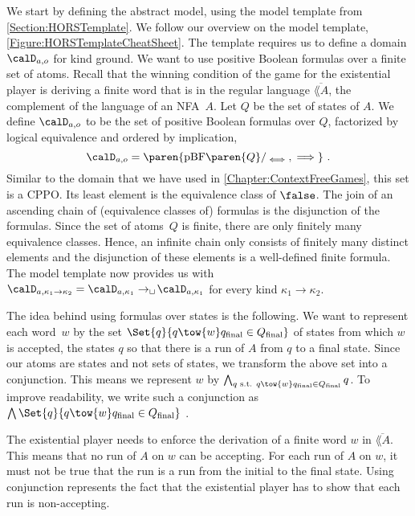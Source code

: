 \documentclass[../../diss.tex]{subfiles}
\begin{document}
We start by defining the abstract model, using the model template from \cref{Section:HORSTemplate}.
We follow our overview on the model template, \cref{Figure:HORSTemplateCheatSheet}.
The template requires us to define a domain $\domaina{\ground}$ for kind ground.
We want to use positive Boolean formulas over a finite set of atoms.
Recall that the winning condition of the game for the existential player is deriving a finite word that is in the regular language $\overline{\lang{A}}$, the complement of the language of an NFA~$A$.
Let $Q$ be the set of states of $A$.
We define $\domaina{\ground}$ to be the set of positive Boolean formulas over $Q$, factorized by logical equivalence and ordered by implication,
\[
    \domaina{\ground} =
    \paren{ \pBF\paren{Q}/_{\lequiv},\lleq }
    \ .
\]
Similar to the domain that we have used in \cref{Chapter:ContextFreeGames}, this set is a CPPO.\@
Its least element is the equivalence class of $\false$.
The join of an ascending chain of (equivalence classes of) formulas is the disjunction of the formulas.
Since the set of atoms~$Q$ is finite, there are only finitely many equivalence classes.
Hence, an infinite chain only consists of finitely many distinct elements and the disjunction of these elements is a well-defined finite formula.
The model template now provides us with $\domaina{\kappa_1 \to \kappa_2} = \domaina{\kappa_1} \cto \domaina{\kappa_1}$ for every kind $\kappa_1 \to \kappa_2$.

The idea behind using formulas over states is the following.
We want to represent each word~$w$ by the set $\Set{ q }{ q \tow{w} \qfinal \in \QF}$ of states from which $w$ is accepted, \ie the states $q$ so that there is a run of $A$ from $q$ to a final state.
Since our atoms are states and not sets of states, we transform the above set into a conjunction.
This means we represent $w$ by $\bigwedge_{q \text{ s.t. } q \tow{w} \qfinal \in \QF} q$.
To improve readability, we write such a conjunction as $\bigwedge \Set{ q }{ q \tow{w} \qfinal \in \QF}$ .

The existential player needs to enforce the derivation of a finite word $w$ in $\overline{\lang{A}}$.
This means that no run of $A$ on $w$ can be accepting.
For each run of $A$ on $w$, it must not be true that the run is a run from the initial to the final state.
Using conjunction represents the fact that the existential player has to show that each run is non-accepting.
\end{document}
